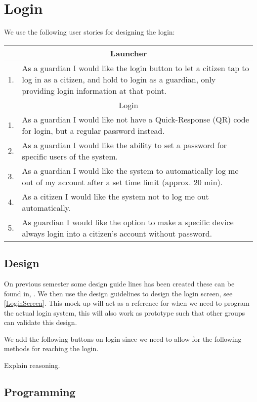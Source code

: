 \section{Login}\label{sec:LoginColab}

We use the following user stories for designing the login:
\begin{table}[H]
\begin{tabular}{|c|p{12.5cm}|}
\hline 
\multicolumn{2}{|c|}{Launcher}\\
\hline
1. & As a guardian I would like the login button to let a citizen tap to log in
as a citizen, and hold to login as a guardian, only providing login information
at that point. \\ \hline
\multicolumn{2}{|c|}{Login}\\ \hline
1. & As a guardian I would like not have a Quick-Response (QR) code for login,
but a regular password instead.\\ \hline
2. & As a guardian I would like the ability to set a password for specific users
of the system.\\ \hline
3. & As a guardian I would like the system to automatically log me out of my
account after a set time limit (approx. 20 min).\\ \hline
4. & As a citizen I would like the system not to log me out automatically.\\ \hline
5. & As guardian I would like the option to make a specific device always login
into a citizen's account without password.\\ \hline
\end{tabular}
\end{table}

\subsection{Design}

On previous semester some design guide lines has been created these can be
found in, . We then use the design
guidelines to design the login screen, see \autoref{LoginScreen}. This mock up
will act as a reference for when we need to program the actual login system,
this will also work as prototype such that other groups can validate this
design. 

We add the following buttons on login since we need to allow for the
following methods for reaching the login.


Explain reasoning.

\subsection{Programming}



